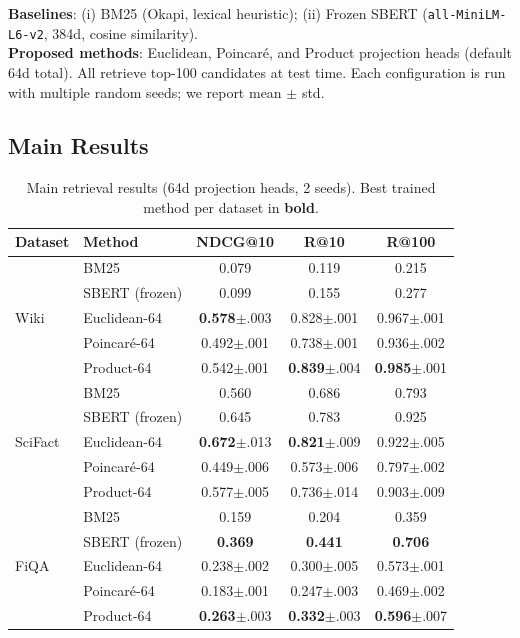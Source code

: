 \documentclass{article}
\begin{document}
\textbf{Baselines}: (i) BM25 (Okapi, lexical heuristic); (ii) Frozen SBERT (\texttt{all-MiniLM-L6-v2}, 384d, cosine similarity). \\
\textbf{Proposed methods}: Euclidean, Poincar\'e, and Product projection heads (default 64d total). All retrieve top-100 candidates at test time. Each configuration is run with multiple random seeds; we report mean $\pm$ std.

\subsection{Main Results}

\begin{table}[h]
\centering
\small
\caption{Main retrieval results (64d projection heads, 2 seeds). Best trained method per dataset in \textbf{bold}.}
\vspace{0.2cm}
\begin{tabular}{@{}llccc@{}}
\toprule
Dataset & Method & NDCG@10 & R@10 & R@100 \\
\midrule
\multirow{5}{*}{Wiki}
& BM25               & 0.079 & 0.119 & 0.215 \\
& SBERT (frozen)      & 0.099 & 0.155 & 0.277 \\
& Euclidean-64        & \textbf{0.578}{\scriptsize$\pm$.003} & 0.828{\scriptsize$\pm$.001} & 0.967{\scriptsize$\pm$.001} \\
& Poincar\'e-64       & 0.492{\scriptsize$\pm$.001} & 0.738{\scriptsize$\pm$.001} & 0.936{\scriptsize$\pm$.002} \\
& Product-64          & 0.542{\scriptsize$\pm$.001} & \textbf{0.839}{\scriptsize$\pm$.004} & \textbf{0.985}{\scriptsize$\pm$.001} \\
\midrule
\multirow{5}{*}{SciFact}
& BM25               & 0.560 & 0.686 & 0.793 \\
& SBERT (frozen)      & 0.645 & 0.783 & 0.925 \\
& Euclidean-64        & \textbf{0.672}{\scriptsize$\pm$.013} & \textbf{0.821}{\scriptsize$\pm$.009} & 0.922{\scriptsize$\pm$.005} \\
& Poincar\'e-64       & 0.449{\scriptsize$\pm$.006} & 0.573{\scriptsize$\pm$.006} & 0.797{\scriptsize$\pm$.002} \\
& Product-64          & 0.577{\scriptsize$\pm$.005} & 0.736{\scriptsize$\pm$.014} & 0.903{\scriptsize$\pm$.009} \\
\midrule
\multirow{5}{*}{FiQA}
& BM25               & 0.159 & 0.204 & 0.359 \\
& SBERT (frozen)      & \textbf{0.369} & \textbf{0.441} & \textbf{0.706} \\
& Euclidean-64        & 0.238{\scriptsize$\pm$.002} & 0.300{\scriptsize$\pm$.005} & 0.573{\scriptsize$\pm$.001} \\
& Poincar\'e-64       & 0.183{\scriptsize$\pm$.001} & 0.247{\scriptsize$\pm$.003} & 0.469{\scriptsize$\pm$.002} \\
& Product-64          & \textbf{0.263}{\scriptsize$\pm$.003} & \textbf{0.332}{\scriptsize$\pm$.003} & \textbf{0.596}{\scriptsize$\pm$.007} \\
\bottomrule
\end{tabular}
\end{table}
\end{document}
